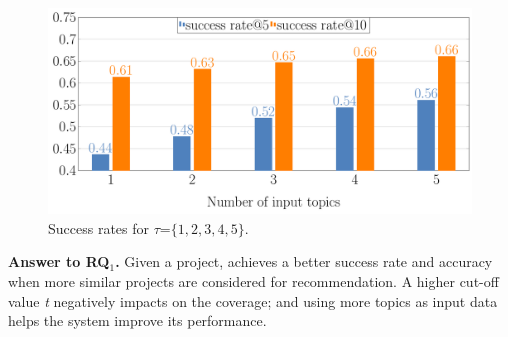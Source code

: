 \begin{figure}[t!]
	\centering
	\includegraphics[width=0.90\linewidth]{figs/successRate_inputTopic.pdf}
	\caption{Success rates for $\tau$=$\{1,2,3,4,5\}$.}
	\label{fig:pr-input-topics}
\end{figure} 




\begin{tcolorbox}[boxrule=0.86pt,left=0.3em, right=0.3em,top=0.1em, bottom=0.05em]
\textbf{Answer to RQ$_1$.} Given a project, \TFa achieves a better success rate and accuracy 
when more similar projects are considered for recommendation.
A higher cut-off value \emph{t} negatively impacts on the coverage; and using more topics as input data helps the system improve its performance.
\end{tcolorbox}


%


